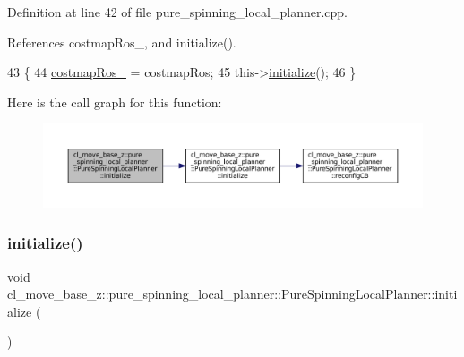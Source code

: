 Definition at line 42 of file pure\+\_\+spinning\+\_\+local\+\_\+planner.\+cpp.



References costmap\+Ros\+\_\+, and initialize().


\begin{DoxyCode}
43 \{
44   \hyperlink{classcl__move__base__z_1_1pure__spinning__local__planner_1_1PureSpinningLocalPlanner_a63f75481071df118d56e8b652e68b002}{costmapRos\_} = costmapRos;
45   this->\hyperlink{classcl__move__base__z_1_1pure__spinning__local__planner_1_1PureSpinningLocalPlanner_a12fc5253f53f66e3e9735a72ebc9343f}{initialize}();
46 \}
\end{DoxyCode}
Here is the call graph for this function\+:
\nopagebreak
\begin{figure}[H]
\begin{center}
\leavevmode
\includegraphics[width=350pt]{classcl__move__base__z_1_1pure__spinning__local__planner_1_1PureSpinningLocalPlanner_ab28ef2ff04e7ec2b74068ea0fe3351d6_cgraph}
\end{center}
\end{figure}
\mbox{\label{classcl__move__base__z_1_1pure__spinning__local__planner_1_1PureSpinningLocalPlanner_a12fc5253f53f66e3e9735a72ebc9343f}} 
\subsubsection{\texorpdfstring{initialize()}{initialize()}\hspace{0.1cm}{\footnotesize\ttfamily [3/3]}}
{\footnotesize\ttfamily void cl\+\_\+move\+\_\+base\+\_\+z\+::pure\+\_\+spinning\+\_\+local\+\_\+planner\+::\+Pure\+Spinning\+Local\+Planner\+::initialize (\begin{DoxyParamCaption}{ }\end{DoxyParamCaption})}



